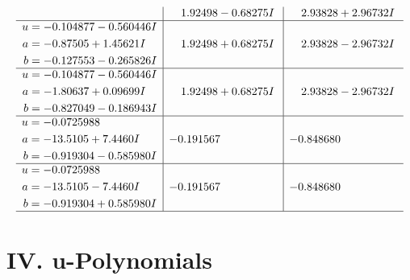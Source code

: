 \documentclass[1p]{elsarticle_modified}
\theoremstyle{definition}
\begin{document}
$$\begin{array}{c|c|c}
 & \phantom{-}1.92498 - 0.68275 I & \phantom{-}2.93828 + 2.96732 I \\ \hline\begin{aligned}
u &= -0.104877 - 0.560446 I \\
a &= -0.87505 + 1.45621 I \\
b &= -0.127553 - 0.265826 I\end{aligned}
 & \phantom{-}1.92498 + 0.68275 I & \phantom{-}2.93828 - 2.96732 I \\ \hline\begin{aligned}
u &= -0.104877 - 0.560446 I \\
a &= -1.80637 + 0.09699 I \\
b &= -0.827049 - 0.186943 I\end{aligned}
 & \phantom{-}1.92498 + 0.68275 I & \phantom{-}2.93828 - 2.96732 I \\ \hline\begin{aligned}
u &= -0.0725988\phantom{ +0.000000I} \\
a &= -13.5105 + 7.4460 I \\
b &= -0.919304 - 0.585980 I\end{aligned}
 & -0.191567\phantom{ +0.000000I} & -0.848680\phantom{ +0.000000I} \\ \hline\begin{aligned}
u &= -0.0725988\phantom{ +0.000000I} \\
a &= -13.5105 - 7.4460 I \\
b &= -0.919304 + 0.585980 I\end{aligned}
 & -0.191567\phantom{ +0.000000I} & -0.848680\phantom{ +0.000000I}\\
 \hline 
 \end{array}$$\newpage
\newpage\renewcommand{\arraystretch}{1}
\centering \section*{ IV. u-Polynomials}
\end{document}
